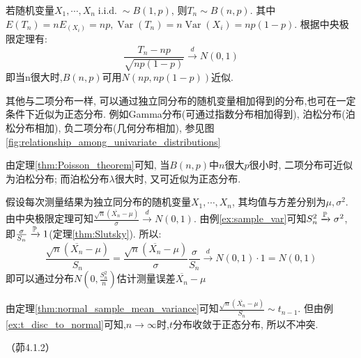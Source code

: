 \begin{example}[二项分布近似为正态分布]
    若随机变量$X_1,\cdots ,X_n \operatorname{i.i.d.} \sim B(1,p)$, 则$T_n \sim B(n,p)$. 其中$E(T_n)=nE_(X_i)=np, \operatorname{Var}(T_n)=n\operatorname{Var}(X_i)=np(1-p)$. 根据中央极限定理有:
    \[ \frac{T_n - np}{\sqrt{np(1-p)}} \xrightarrow{d} N(0,1) \]
    即当n很大时,$B(n,p)$可用$N(np,np(1-p))$近似.
\end{example}
\begin{remark}
    其他与二项分布一样, 可以通过独立同分布的随机变量相加得到的分布,也可在一定条件下近似为正态分布. 例如Gamma分布(可通过指数分布相加得到), 泊松分布(泊松分布相加), 负二项分布(几何分布相加), 参见图\ref{fig:relationship_among_univariate_distributions}
\end{remark}
\begin{remark}
    由定理\ref{thm:Poisson_theorem}可知, 当$B(n,p)$中$n$很大$p$很小时, 二项分布可近似为泊松分布; 而泊松分布$\lambda$很大时, 又可近似为正态分布.
\end{remark}

\begin{example}[测量误差估计]
    假设每次测量结果为独立同分布的随机变量$X_1,\cdots ,X_n$, 其均值与方差分别为$\mu,\sigma^2$. 由中央极限定理可知$\frac{\sqrt{n}(\overline{X_n}-\mu)}{\sigma} \xrightarrow{d} N(0,1)$. 由例\ref{ex:sample_var}可知$S_n^2 \xrightarrow{\P} \sigma^2$, 即$\frac{\sigma}{S_n} \xrightarrow{\P} 1$(定理\ref{thm:Slutsky}). 所以:
    \[ \frac{\sqrt{n}(\overline{X_n}-\mu)}{S_n}=\frac{\sqrt{n}(\overline{X_n}-\mu)}{\sigma}\frac{\sigma}{S_n} \xrightarrow{d} N(0,1)\cdot 1=N(0,1) \]
    即可以通过分布$N(0,\frac{S_n^2}{n})$估计测量误差$\overline{X_n}-\mu$
\end{example}
\begin{remark}
    由定理\ref{thm:normal_sample_mean_variance}可知$\frac{\sqrt{n}(\overline{X_n}-\mu)}{S_n} \sim t_{n-1}$. 但由例\ref{ex:t_disc_to_normal}可知,$n\to \infty$时,$t$分布收敛于正态分布, 所以不冲突.
\end{remark}


\begin{problemset}[错题记录]
    \item （茆4.1.2）
\end{problemset}